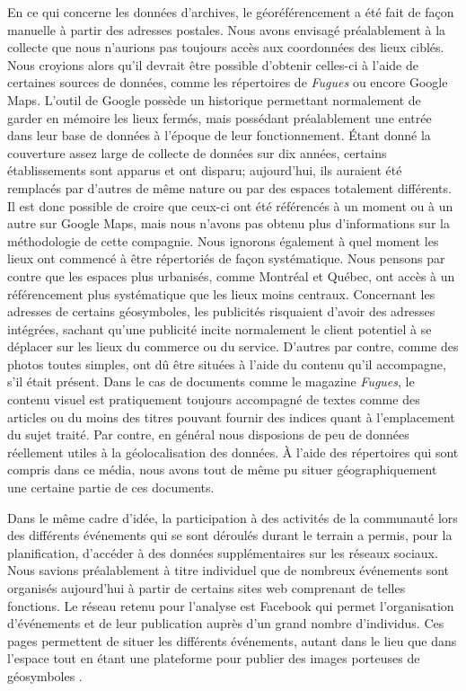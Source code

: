 En ce qui concerne les données d'archives, le géoréférencement a été fait de façon manuelle à partir des adresses postales.
Nous avons envisagé préalablement à la collecte que nous n'aurions pas toujours accès aux coordonnées des lieux ciblés.
Nous croyions alors qu'il devrait être possible d'obtenir celles-ci à l'aide de certaines sources de données, comme les répertoires de \emph{Fugues} ou encore Google Maps.
L'outil de Google possède un historique permettant normalement de garder en mémoire les lieux fermés, mais possédant préalablement une entrée dans leur base de données à l'époque de leur fonctionnement.
Étant donné la couverture assez large de collecte de données sur dix années, certains établissements sont apparus et ont disparu; aujourd'hui, ils auraient été remplacés par d'autres de même nature ou par des espaces totalement différents.
Il est donc possible de croire que ceux-ci ont été référencés à un moment ou à un autre sur Google Maps, mais nous n'avons pas obtenu plus d'informations sur la méthodologie de cette compagnie.
Nous ignorons également à quel moment les lieux ont commencé à être répertoriés de façon systématique.
Nous pensons par contre que les espaces plus urbanisés, comme Montréal et Québec, ont accès à un référencement plus systématique que les lieux moins centraux.
Concernant les adresses de certains géosymboles, les publicités risquaient d'avoir des adresses intégrées, sachant qu'une publicité incite normalement le client potentiel à se déplacer sur les lieux du commerce ou du service.
D'autres par contre, comme des photos toutes simples, ont dû être situées à l'aide du contenu qu'il accompagne, s'il était présent.
Dans le cas de documents comme le magazine \emph{Fugues}, le contenu visuel est pratiquement toujours accompagné de textes comme des articles ou du moins des titres pouvant fournir des indices quant à l'emplacement du sujet traité.
Par contre, en général nous disposions de peu de données réellement utiles à la géolocalisation des données.
À l'aide des répertoires qui sont compris dans ce média, nous avons tout de même pu situer géographiquement une certaine partie de ces documents.

Dans le même cadre d'idée, la participation à des activités de la communauté \lgbt{} lors des différents événements qui se sont déroulés durant le terrain a permis, pour la planification, d'accéder à des données supplémentaires sur les réseaux sociaux.
Nous savions préalablement à titre individuel que de nombreux événements sont organisés aujourd'hui à partir de certains sites web comprenant de telles fonctions.
Le réseau retenu pour l'analyse est Facebook qui permet l'organisation d'événements et de leur publication auprès d'un grand nombre d'individus.
Ces pages permettent de situer les différents événements, autant dans le lieu que dans l'espace tout en étant une plateforme pour publier des images porteuses de géosymboles
\citep{Barkhuus2010, Boyd2010}.

